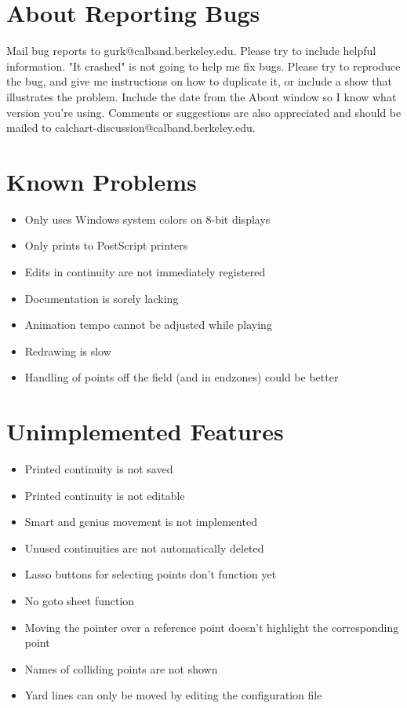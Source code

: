 \section{About Reporting Bugs}\label{reportingbugs}

Mail bug reports to gurk@calband.berkeley.edu.  Please try to include
helpful information.  "It crashed" is not going to help me fix bugs.
Please try to reproduce the bug, and give me instructions on how to
duplicate it, or include a show that illustrates the problem.  Include
the date from the About window so I know what version you're using.  Comments
or suggestions are also appreciated and should be mailed to
calchart-discussion@calband.berkeley.edu.

\section{Known Problems}\label{problems}

\begin{itemize}\itemsep=0pt
\item Only uses Windows system colors on 8-bit displays
\item Only prints to PostScript printers
\item Edits in continuity are not immediately registered
\item Documentation is sorely lacking
\item Animation tempo cannot be adjusted while playing
\item Redrawing is slow
\item Handling of points off the field (and in endzones) could be better
\end{itemize}

\section{Unimplemented Features}\label{notdone}

\begin{itemize}\itemsep=0pt
\item Printed continuity is not saved
\item Printed continuity is not editable
\item Smart and genius movement is not implemented
\item Unused continuities are not automatically deleted
\item Lasso buttons for selecting points don't function yet
\item No goto sheet function
\item Moving the pointer over a reference point doesn't highlight the
corresponding point
\item Names of colliding points are not shown
\item Yard lines can only be moved by editing the configuration file
\end{itemize}

